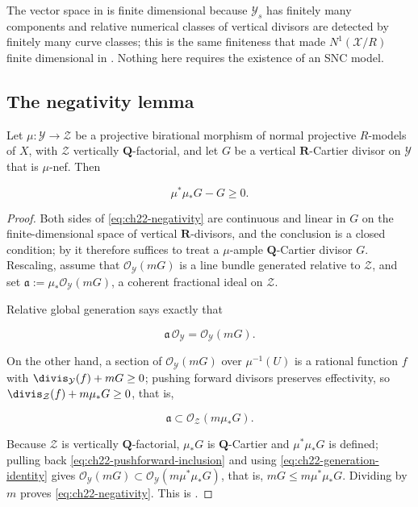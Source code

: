 \begin{remark}
\label{rem:ch22-nef-approximation-finite-dimensional}
The vector space in  is finite dimensional
because $\mathcal Y_s$ has finitely many components and relative numerical
classes of vertical divisors are detected by finitely many curve classes;
this is the same finiteness that made $N^1(\mathcal X/R)$ finite
dimensional in .  Nothing here requires the
existence of an SNC model.
\end{remark}

\subsection{The negativity lemma}

\begin{lemma}
\label{lem:ch22-negativity}
Let $\mu:\mathcal Y\to\mathcal Z$ be a projective birational morphism of
normal projective $R$-models of $X$, with $\mathcal Z$ vertically
$\mathbf Q$-factorial, and let $G$ be a vertical $\mathbf R$-Cartier
divisor on $\mathcal Y$ that is $\mu$-nef.  Then

\[
                 \mu^*\mu_*G-G\geq0 .
\tag{22.31}\label{eq:ch22-negativity}
\]
\end{lemma}

\begin{proof}
Both sides of \eqref{eq:ch22-negativity} are continuous and linear in $G$
on the finite-dimensional space of vertical $\mathbf R$-divisors, and the
conclusion is a closed condition; by
 it therefore suffices to treat a
$\mu$-ample $\mathbf Q$-Cartier divisor $G$.  Rescaling, assume that
$\mathcal O_{\mathcal Y}(mG)$ is a line bundle generated relative to
$\mathcal Z$, and set
$\mathfrak a:=\mu_*\mathcal O_{\mathcal Y}(mG)$, a coherent fractional
ideal on $\mathcal Z$.

Relative global generation says exactly that

\[
       \mathfrak a\,\mathcal O_{\mathcal Y}
       =\mathcal O_{\mathcal Y}(mG).
\tag{22.32}\label{eq:ch22-generation-identity}
\]

On the other hand, a section of $\mathcal O_{\mathcal Y}(mG)$ over
$\mu^{-1}(U)$ is a rational function $f$ with
$\divis_{\mathcal Y}(f)+mG\geq0$; pushing forward divisors preserves
effectivity, so $\divis_{\mathcal Z}(f)+m\mu_*G\geq0$, that is,

\[
 \mathfrak a\subset\mathcal O_{\mathcal Z}(m\mu_*G).
\tag{22.33}\label{eq:ch22-pushforward-inclusion}
\]

Because $\mathcal Z$ is vertically $\mathbf Q$-factorial, $\mu_*G$ is
$\mathbf Q$-Cartier and $\mu^*\mu_*G$ is defined; pulling back
\eqref{eq:ch22-pushforward-inclusion} and using
\eqref{eq:ch22-generation-identity} gives
$\mathcal O_{\mathcal Y}(mG)\subset\mathcal O_{\mathcal Y}(m\mu^*\mu_*G)$,
that is, $mG\leq m\mu^*\mu_*G$.  Dividing by $m$ proves
\eqref{eq:ch22-negativity}.  This is \cite[Lemma~1.6]{BFJ16}.
\end{proof}

